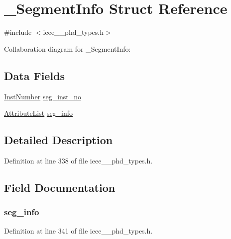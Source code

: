 \hypertarget{struct___segment_info}{}\section{\+\_\+\+Segment\+Info Struct Reference}
\label{struct___segment_info}


{\ttfamily \#include $<$ieee\+\_\+\_\+phd\+\_\+types.\+h$>$}



Collaboration diagram for \+\_\+\+Segment\+Info\+:
\subsection*{Data Fields}
\begin{DoxyCompactItemize}
\item 
\hyperlink{ieee__11073__phd__types_8h_ab78fcfd5f6e61b2c8de677df291cc4d7}{Inst\+Number} \hyperlink{struct___segment_info_adf7e08dd5bd0cc5b6bdd34f692c64f24}{seg\+\_\+inst\+\_\+no}
\item 
\hyperlink{ieee__11073__phd__types_8h_a87a34d3be532804006242c172e4beea2}{Attribute\+List} \hyperlink{struct___segment_info_a5006dd88fe30ccdb8387386969087378}{seg\+\_\+info}
\end{DoxyCompactItemize}


\subsection{Detailed Description}


Definition at line 338 of file ieee\+\_\+\_\+phd\+\_\+types.\+h.



\subsection{Field Documentation}
\hypertarget{struct___segment_info_a5006dd88fe30ccdb8387386969087378}{}
\subsubsection[{seg\+\_\+info}]{ seg\+\_\+info}\label{struct___segment_info_a5006dd88fe30ccdb8387386969087378}


Definition at line 341 of file ieee\+\_\+\_\+phd\+\_\+types.\+h.

